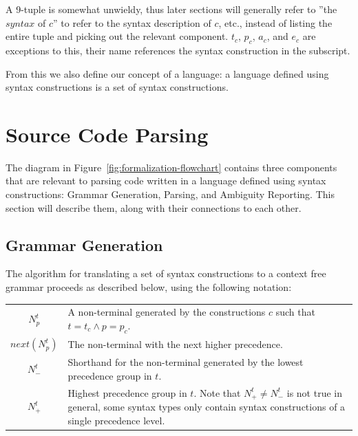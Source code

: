 \documentclass{kththesis}
\begin{document}
A 9-tuple is somewhat unwieldy, thus later sections will generally refer to ''the $syntax$ of $c$'' to refer to the syntax description of $c$, etc., instead of listing the entire tuple and picking out the relevant component. $t_c$, $p_c$, $a_c$, and $e_c$ are exceptions to this, their name references the syntax construction in the subscript.

From this we also define our concept of a language: a language defined using syntax constructions is a set of syntax constructions.

\section{Source Code Parsing}

The diagram in Figure~\ref{fig:formalization-flowchart} contains three components that are relevant to parsing code written in a language defined using syntax constructions: Grammar Generation, Parsing, and Ambiguity Reporting. This section will describe them, along with their connections to each other.

\subsection{Grammar Generation} \label{sec:formalization-grammar-generation}

The algorithm for translating a set of syntax constructions to a context free grammar proceeds as described below, using the following notation:

\mathligsoff
{\tabulinesep=2mm
\begin{tabu}{c|p{10cm}}
$N^t_p$ & A non-terminal generated by the constructions $c$ such that $t = t_c \land p = p_c$. \\
$next(N^t_p)$ & The non-terminal with the next higher precedence. \\
$N^t_-$ & Shorthand for the non-terminal generated by the lowest precedence group in $t$. \\
$N^t_+$ & Highest precedence group in $t$. Note that $N^t_+ \neq N^t_-$ is not true in general, some syntax types only contain syntax constructions of a single precedence level. \\
\end{tabu}
}
\end{document}
